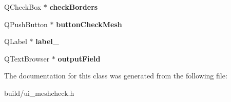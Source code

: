 \begin{DoxyCompactItemize}
\item 
\hypertarget{class_ui___mesh_check_widget_ae113bb8bef85ac370647c4d2e77f44c5}{}Q\+Check\+Box $\ast$ {\bfseries check\+Borders}\label{class_ui___mesh_check_widget_ae113bb8bef85ac370647c4d2e77f44c5}

\item 
\hypertarget{class_ui___mesh_check_widget_a9073665086eeaae7ba99a85a90bef93f}{}Q\+Push\+Button $\ast$ {\bfseries button\+Check\+Mesh}\label{class_ui___mesh_check_widget_a9073665086eeaae7ba99a85a90bef93f}

\item 
\hypertarget{class_ui___mesh_check_widget_a24c9a99d3cb2adeed33f9a91aa3768b3}{}Q\+Label $\ast$ {\bfseries label\+\_}\label{class_ui___mesh_check_widget_a24c9a99d3cb2adeed33f9a91aa3768b3}

\item 
\hypertarget{class_ui___mesh_check_widget_aad9a3f1907b42ee332d935a60ebebb4d}{}Q\+Text\+Browser $\ast$ {\bfseries output\+Field}\label{class_ui___mesh_check_widget_aad9a3f1907b42ee332d935a60ebebb4d}

\end{DoxyCompactItemize}


The documentation for this class was generated from the following file\+:\begin{DoxyCompactItemize}
\item 
build/ui\+\_\+meshcheck.\+h\end{DoxyCompactItemize}
